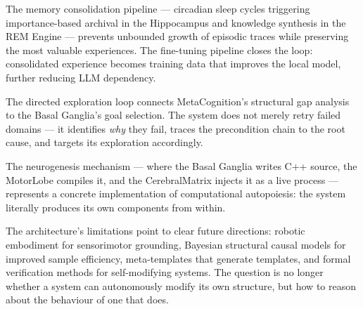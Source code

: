 \documentclass[12pt,a4paper]{report}
\begin{document}
The memory consolidation pipeline --- circadian sleep cycles triggering importance-based archival in the Hippocampus and knowledge synthesis in the REM Engine --- prevents unbounded growth of episodic traces while preserving the most valuable experiences. The fine-tuning pipeline closes the loop: consolidated experience becomes training data that improves the local model, further reducing LLM dependency.

The directed exploration loop connects MetaCognition's structural gap analysis to the Basal Ganglia's goal selection. The system does not merely retry failed domains --- it identifies \emph{why} they fail, traces the precondition chain to the root cause, and targets its exploration accordingly.

The neurogenesis mechanism --- where the Basal Ganglia writes C++ source, the MotorLobe compiles it, and the CerebralMatrix injects it as a live process --- represents a concrete implementation of computational autopoiesis: the system literally produces its own components from within.

The architecture's limitations point to clear future directions: robotic embodiment for sensorimotor grounding, Bayesian structural causal models for improved sample efficiency, meta-templates that generate templates, and formal verification methods for self-modifying systems. The question is no longer whether a system can autonomously modify its own structure, but how to reason about the behaviour of one that does.
\end{document}
